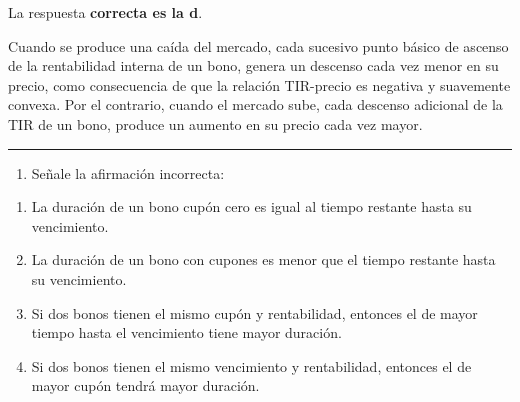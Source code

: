 \documentclass[
  letterpaper,
  DIV=11,
  numbers=noendperiod]{scrreprt}
\providecommand{\tightlist}{%
  \setlength{\itemsep}{0pt}\setlength{\parskip}{0pt}}\usepackage{longtable,booktabs,array}
\begin{document}
\begin{tcolorbox}[enhanced jigsaw, left=2mm, opacityback=0, colback=white, breakable, arc=.35mm, bottomrule=.15mm, rightrule=.15mm, toprule=.15mm, leftrule=.75mm, colframe=quarto-callout-tip-color-frame]
\begin{minipage}[t]{5.5mm}
\textcolor{quarto-callout-tip-color}{\faLightbulb}
\end{minipage}%
\begin{minipage}[t]{\textwidth - 5.5mm}

La respuesta \textbf{correcta es la d}.

Cuando se produce una caída del mercado, cada sucesivo punto básico de
ascenso de la rentabilidad interna de un bono, genera un descenso cada
vez menor en su precio, como consecuencia de que la relación TIR-precio
es negativa y suavemente convexa. Por el contrario, cuando el mercado
sube, cada descenso adicional de la TIR de un bono, produce un aumento
en su precio cada vez mayor.

\end{minipage}%
\end{tcolorbox}

\begin{center}\rule{0.5\linewidth}{0.5pt}\end{center}

\begin{enumerate}
\def\labelenumi{\arabic{enumi}.}
\setcounter{enumi}{85}
\tightlist
\item
  Señale la afirmación incorrecta:
\end{enumerate}

\begin{enumerate}
\def\labelenumi{\alph{enumi})}
\item
  La duración de un bono cupón cero es igual al tiempo restante hasta su
  vencimiento.
\item
  La duración de un bono con cupones es menor que el tiempo restante
  hasta su vencimiento.
\item
  Si dos bonos tienen el mismo cupón y rentabilidad, entonces el de
  mayor tiempo hasta el vencimiento tiene mayor duración.
\item
  Si dos bonos tienen el mismo vencimiento y rentabilidad, entonces el
  de mayor cupón tendrá mayor duración.
\end{enumerate}
\end{document}

